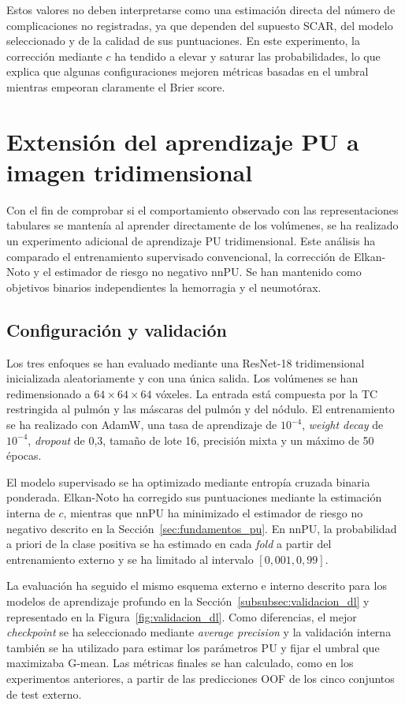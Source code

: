 Estos valores no deben interpretarse como una estimación directa del número de complicaciones no registradas, ya que dependen del supuesto SCAR, del modelo seleccionado y de la calidad de sus puntuaciones. En este experimento, la corrección mediante \(c\) ha tendido a elevar y saturar las probabilidades, lo que explica que algunas configuraciones mejoren métricas basadas en el umbral mientras empeoran claramente el Brier score.


\section{Extensión del aprendizaje PU a imagen tridimensional}\label{sec:pu_3d}

Con el fin de comprobar si el comportamiento observado con las representaciones tabulares se mantenía al aprender directamente de los volúmenes, se ha realizado un experimento adicional de aprendizaje PU tridimensional. Este análisis ha comparado el entrenamiento supervisado convencional, la corrección de Elkan-Noto y el estimador de riesgo no negativo nnPU. Se han mantenido como objetivos binarios independientes la hemorragia y el neumotórax.

\subsection{Configuración y validación}

Los tres enfoques se han evaluado mediante una ResNet-18 tridimensional inicializada aleatoriamente y con una única salida. Los volúmenes se han redimensionado a \(64 \times 64 \times 64\) vóxeles. La entrada está compuesta por la TC restringida al pulmón y las máscaras del pulmón y del nódulo. El entrenamiento se ha realizado con AdamW, una tasa de aprendizaje de \(10^{-4}\), \textit{weight decay} de \(10^{-4}\), \textit{dropout} de 0,3, tamaño de lote 16, precisión mixta y un máximo de 50 épocas.

El modelo supervisado se ha optimizado mediante entropía cruzada binaria ponderada. Elkan-Noto ha corregido sus puntuaciones mediante la estimación interna de \(c\), mientras que nnPU ha minimizado el estimador de riesgo no negativo descrito en la Sección~\ref{sec:fundamentos_pu}. En nnPU, la probabilidad a priori de la clase positiva se ha estimado en cada \textit{fold} a partir del entrenamiento externo y se ha limitado al intervalo \([0{,}001,0{,}99]\).

La evaluación ha seguido el mismo esquema externo e interno descrito para los modelos de aprendizaje profundo en la Sección~\ref{subsubsec:validacion_dl} y representado en la Figura~\ref{fig:validacion_dl}. Como diferencias, el mejor \textit{checkpoint} se ha seleccionado mediante \textit{average precision} y la validación interna también se ha utilizado para estimar los parámetros PU y fijar el umbral que maximizaba G-mean. Las métricas finales se han calculado, como en los experimentos anteriores, a partir de las predicciones OOF de los cinco conjuntos de test externo.


